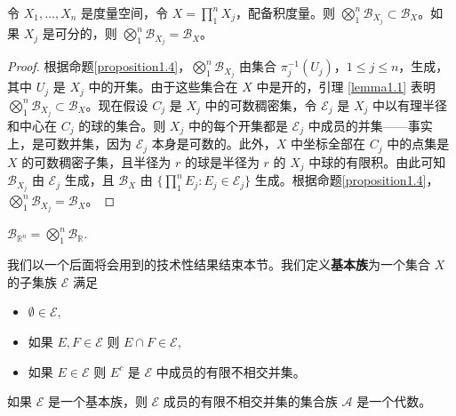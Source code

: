 \documentclass[lang=cn,10pt,thmcnt=section]{elegantbook}
\begin{document}
\begin{proposition}\label{proposition1.5}
令 $X_1,\ldots,X_n$ 是度量空间，令 $X = \prod_{1}^{n} X_j$，配备积度量。则 $\bigotimes_{1}^{n} \mathcal{B}_{X_j} \subset \mathcal{B}_X$。如果 $X_j$ 是可分的，则 $\bigotimes_{1}^{n} \mathcal{B}_{X_j} = \mathcal{B}_X$。
\end{proposition}

\begin{proof}
根据命题\ref{proposition1.4}，$\bigotimes_{1}^{n} \mathcal{B}_{X_j}$ 由集合 $\pi_j^{-1}(U_j)$，$1 \leq j \leq n$，生成，其中 $U_j$ 是 $X_j$ 中的开集。由于这些集合在 $X$ 中是开的，引理 \ref{lemma1.1} 表明 $\bigotimes_{1}^{n} \mathcal{B}_{X_j} \subset \mathcal{B}_X$。现在假设 $C_j$ 是 $X_j$ 中的可数稠密集，令 $\mathcal{E}_j$ 是 $X_j$ 中以有理半径和中心在 $C_j$ 的球的集合。则 $X_j$ 中的每个开集都是 $\mathcal{E}_j$ 中成员的并集——事实上，是可数并集，因为 $\mathcal{E}_j$ 本身是可数的。此外，$X$ 中坐标全部在 $C_j$ 中的点集是 $X$ 的可数稠密子集，且半径为 $r$ 的球是半径为 $r$ 的 $X_j$ 中球的有限积。由此可知 $\mathcal{B}_{X_j}$ 由 $\mathcal{E}_j$ 生成，且 $\mathcal{B}_X$ 由 $\{\prod_{1}^{n} E_j : E_j \in \mathcal{E}_j\}$ 生成。根据命题\ref{proposition1.4}，$\bigotimes_{1}^{n} \mathcal{B}_{X_j} = \mathcal{B}_X$。
\end{proof}

\begin{corollary}\label{corollary1.6}
$\mathcal{B}_{\mathbb{R}^n} = \bigotimes_{1}^{n} \mathcal{B}_\mathbb{R}$.
\end{corollary}

我们以一个后面将会用到的技术性结果结束本节。我们定义\textbf{基本族}为一个集合 $X$ 的子集族 $\mathcal{E}$ 满足
\begin{itemize}
\item $\emptyset \in \mathcal{E}$,
\item 如果 $E, F \in \mathcal{E}$ 则 $E \cap F \in \mathcal{E}$,
\item 如果 $E \in \mathcal{E}$ 则 $E^c$ 是 $\mathcal{E}$ 中成员的有限不相交并集。
\end{itemize}

\begin{proposition}\label{proposition1.7}
如果 $\mathcal{E}$ 是一个基本族，则 $\mathcal{E}$ 成员的有限不相交并集的集合族 $\mathcal{A}$ 是一个代数。
\end{proposition}
\end{document}
